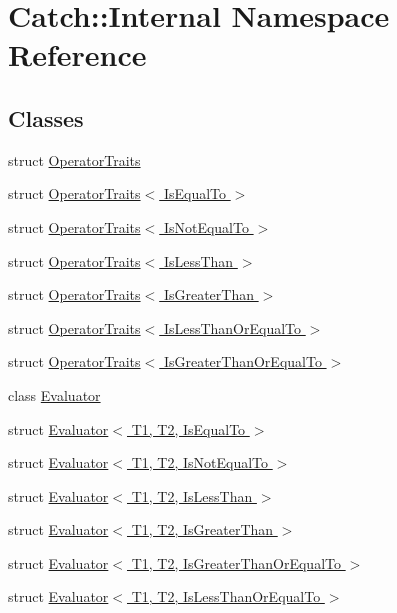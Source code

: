 \hypertarget{namespace_catch_1_1_internal}{\section{Catch\-:\-:Internal Namespace Reference}
\label{namespace_catch_1_1_internal}
}
\subsection*{Classes}
\begin{DoxyCompactItemize}
\item 
struct \hyperlink{struct_catch_1_1_internal_1_1_operator_traits}{Operator\-Traits}
\item 
struct \hyperlink{struct_catch_1_1_internal_1_1_operator_traits_3_01_is_equal_to_01_4}{Operator\-Traits$<$ Is\-Equal\-To $>$}
\item 
struct \hyperlink{struct_catch_1_1_internal_1_1_operator_traits_3_01_is_not_equal_to_01_4}{Operator\-Traits$<$ Is\-Not\-Equal\-To $>$}
\item 
struct \hyperlink{struct_catch_1_1_internal_1_1_operator_traits_3_01_is_less_than_01_4}{Operator\-Traits$<$ Is\-Less\-Than $>$}
\item 
struct \hyperlink{struct_catch_1_1_internal_1_1_operator_traits_3_01_is_greater_than_01_4}{Operator\-Traits$<$ Is\-Greater\-Than $>$}
\item 
struct \hyperlink{struct_catch_1_1_internal_1_1_operator_traits_3_01_is_less_than_or_equal_to_01_4}{Operator\-Traits$<$ Is\-Less\-Than\-Or\-Equal\-To $>$}
\item 
struct \hyperlink{struct_catch_1_1_internal_1_1_operator_traits_3_01_is_greater_than_or_equal_to_01_4}{Operator\-Traits$<$ Is\-Greater\-Than\-Or\-Equal\-To $>$}
\item 
class \hyperlink{class_catch_1_1_internal_1_1_evaluator}{Evaluator}
\item 
struct \hyperlink{struct_catch_1_1_internal_1_1_evaluator_3_01_t1_00_01_t2_00_01_is_equal_to_01_4}{Evaluator$<$ T1, T2, Is\-Equal\-To $>$}
\item 
struct \hyperlink{struct_catch_1_1_internal_1_1_evaluator_3_01_t1_00_01_t2_00_01_is_not_equal_to_01_4}{Evaluator$<$ T1, T2, Is\-Not\-Equal\-To $>$}
\item 
struct \hyperlink{struct_catch_1_1_internal_1_1_evaluator_3_01_t1_00_01_t2_00_01_is_less_than_01_4}{Evaluator$<$ T1, T2, Is\-Less\-Than $>$}
\item 
struct \hyperlink{struct_catch_1_1_internal_1_1_evaluator_3_01_t1_00_01_t2_00_01_is_greater_than_01_4}{Evaluator$<$ T1, T2, Is\-Greater\-Than $>$}
\item 
struct \hyperlink{struct_catch_1_1_internal_1_1_evaluator_3_01_t1_00_01_t2_00_01_is_greater_than_or_equal_to_01_4}{Evaluator$<$ T1, T2, Is\-Greater\-Than\-Or\-Equal\-To $>$}
\item 
struct \hyperlink{struct_catch_1_1_internal_1_1_evaluator_3_01_t1_00_01_t2_00_01_is_less_than_or_equal_to_01_4}{Evaluator$<$ T1, T2, Is\-Less\-Than\-Or\-Equal\-To $>$}
\end{DoxyCompactItemize}
